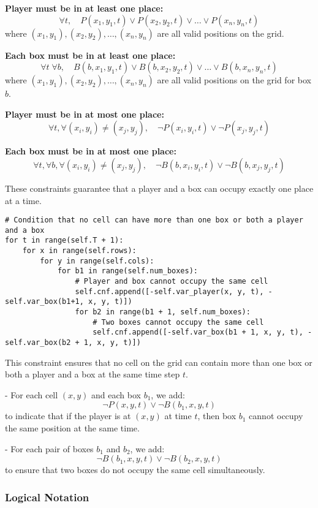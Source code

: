 \documentclass[12pt,a4paper]{article}
\begin{document}
\textbf{Player must be in at least one place:}
\[
\forall t, \quad P(x_1, y_1, t) \lor P(x_2, y_2, t) \lor \dots \lor P(x_n, y_n, t)
\]
where \((x_1, y_1), (x_2, y_2), \dots, (x_n, y_n)\) are all valid positions on the grid.

\textbf{Each box must be in at least one place:}
\[
\forall t \; \forall b, \quad B(b, x_1, y_1, t) \lor B(b, x_2, y_2, t) \lor \dots \lor B(b, x_n, y_n, t)
\]
where \((x_1, y_1), (x_2, y_2), \dots, (x_n, y_n)\) are all valid positions on the grid for box \(b\).

\textbf{Player must be in at most one place:}
\[
\forall t, \forall (x_i, y_i) \neq (x_j, y_j), \quad \neg P(x_i, y_i, t) \lor \neg P(x_j, y_j, t)
\]

\textbf{Each box must be in at most one place:}
\[
\forall t, \forall b, \forall (x_i, y_i) \neq (x_j, y_j), \quad \neg B(b, x_i, y_i, t) \lor \neg B(b, x_j, y_j, t)
\]

These constraints guarantee that a player and a box can occupy exactly one place at a time.



\begin{lstlisting}
# Condition that no cell can have more than one box or both a player and a box
for t in range(self.T + 1):
    for x in range(self.rows):
        for y in range(self.cols):
            for b1 in range(self.num_boxes):
                # Player and box cannot occupy the same cell
                self.cnf.append([-self.var_player(x, y, t), -self.var_box(b1+1, x, y, t)])
                for b2 in range(b1 + 1, self.num_boxes):
                    # Two boxes cannot occupy the same cell
                    self.cnf.append([-self.var_box(b1 + 1, x, y, t), -self.var_box(b2 + 1, x, y, t)])
\end{lstlisting}

This constraint ensures that no cell on the grid can contain more than one box or both a player and a box at the same time step \(t\).  

- For each cell \((x,y)\) and each box \(b_1\), we add:
\[
\neg P(x,y,t) \lor \neg B(b_1, x, y, t)
\]
to indicate that if the player is at \((x,y)\) at time \(t\), then box \(b_1\) cannot occupy the same position at the same time.  

- For each pair of boxes \(b_1\) and \(b_2\), we add:
\[
\neg B(b_1, x, y, t) \lor \neg B(b_2, x, y, t)
\]
to ensure that two boxes do not occupy the same cell simultaneously.

\subsubsection*{Logical Notation}
\end{document}
